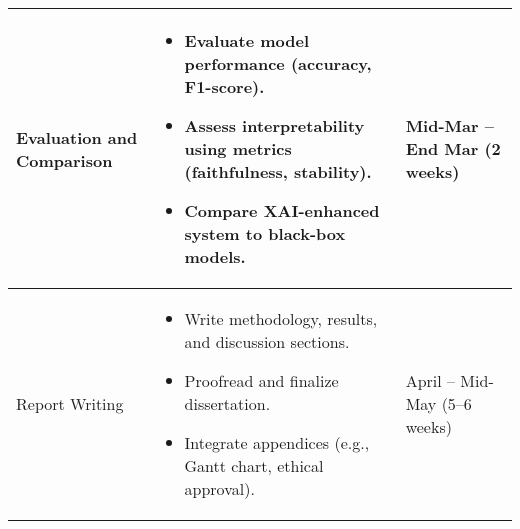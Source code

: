 \begin{longtable}{|p{5cm}|p{6cm}|p{4cm}|}
    Evaluation and Comparison & 
    \begin{itemize}
        \item Evaluate model performance (accuracy, F1-score).
        \item Assess interpretability using metrics (faithfulness, stability).
        \item Compare XAI-enhanced system to black-box models.
    \end{itemize} & 
    Mid-Mar – End Mar (2 weeks) \\
    \hline
    
    Report Writing & 
    \begin{itemize}
        \item Write methodology, results, and discussion sections.
        \item Proofread and finalize dissertation.
        \item Integrate appendices (e.g., Gantt chart, ethical approval).
    \end{itemize} & 
    April – Mid-May (5–6 weeks) \\
    \hline
    
    \end{longtable}
    